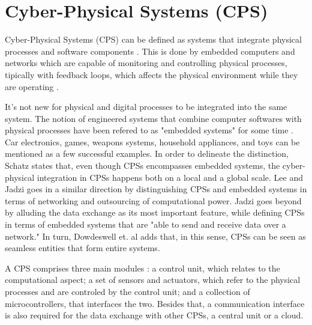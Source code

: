 \section{Cyber-Physical Systems (CPS)}  \label{sec:bgCPS}

Cyber-Physical Systems (CPS) can be defined as systems that integrate physical processes and software components \cite{lee2008cyber}. This is done by embedded computers and networks which are capable of monitoring and controlling physical processes, tipically with feedback loops, which affects the physical environment while they are operating \cite{banerjee2011ensuring}.


It's not new for physical and digital processes to be integrated into the same system. The notion of engineered systems that combine computer softwares with physical processes have been refered to as "embedded systems" for some time \cite{lee2008cyber}. Car electronics, games, weapons systems, household appliances, and toys can be mentioned as a few successful examples. In order to delineate the distinction, Schatz \cite{schatz2014role} states that, even though CPSs encompasses embedded systems, the cyber-physical integration in CPSs happens both on a local and a global scale. Lee \cite{lee2008cyber} and Jadzi \cite{jazdi2014cyber} goes in a similar direction by distinguishing CPSs and embedded systems in terms of networking and outsourcing of computational power. Jadzi \cite{jazdi2014cyber} goes beyond by alluding the data exchange as its most important feature, while defining CPSs in terms of embedded systems that are "able to send and receive data over a network." In turn, Dowdeswell et. al \cite{dowdeswell2020finding} adds that, in this sense, CPSs can be seen as seamless entities that form entire systems.

A CPS comprises three main modules \cite{jazdi2014cyber}: a control unit, which relates to the computational aspect; a set of sensors and actuators, which refer to the physical processes and are controled by the control unit; and a collection of microcontrollers, that interfaces the two. Besides that, a communication interface is also required for the data exchange with other CPSs, a central unit or a cloud. 

